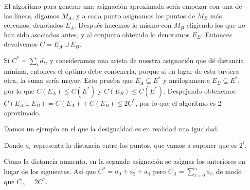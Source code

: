 \documentclass[AL.tex]{subfiles}
\begin{document}
 

El algoritmo para generar una asignación aproximada sería empezar con una de las líneas, digamos $M_A$, y a cada punto asignamos los puntos de $M_B$ más cercanos, denotados $E_A$. Después hacemos lo mismo con $M_B$ eligiendo los que no han sido asociados antes, y al conjunto obtenido lo denotamos $E_B$: Entonces devolvemos $C=E_A\sqcup E_B$. 

Si $C^*=\sum_i d_i$, y consideramos una arista de nuestra asignación que dé distancia mínima, entonces el óptimo debe contenerla, porque si en lugar de esta tuviera otra, la suma sería mayor. Esto prueba que $E_A\subseteq E^*$ y análogamente $E_B\subseteq E^*$, por lo que $C(E_A)\leq C(E^*)$ y $C(E_B)\leq C(E^*)$. Despejando obtenemos $C(E_A\sqcup E_B)=C(E_A)+C(E_B)\leq 2C^*$, por lo que el algoritmo es 2-aproximado. 

\begin{ej}
Damos un ejemplo en el que la desigualdad es en realidad una igualdad. 

Donde $a_i$ representa la distancia entre los puntos, que vamos a suponer que es $2^i$.

Como la distancia aumenta, en la segunda asignación se asignas los anteriores en lugar de los siguientes. Así que $C^*=a_0+a_2+a_4$ pero $C_A=\sum_{i=0}^5 a_i$, de modo que $C_A=2C^*$. 
\end{ej}
\end{document}
